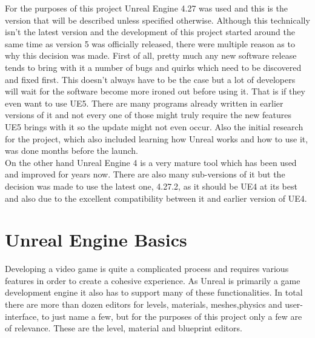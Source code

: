 For the purposes of this project Unreal Engine 4.27 was used and this is the version that will be described unless specified otherwise. Although this technically isn't the latest version and the development of this project started around the same time as version 5 was officially released, there were multiple reason as to why this decision was made. First of all, pretty much any new software release tends to bring with it a number of bugs and quirks which need to be discovered and fixed first. This doesn't always have to be the case but a lot of developers will wait for the software become more ironed out before using it. That is if they even want to use UE5. There are many programs already written in earlier versions of it and not every one of those might truly require the new features UE5 brings with it so the update might not even occur. Also the initial research for the project, which also included learning how Unreal works and how to use it, was done months before the launch.\\ On the other hand Unreal Engine 4 is a very mature tool which has been used and improved for years now. There are also many sub-versions of it but the decision was made to use the latest one, 4.27.2, as it should be UE4 at its best and also due to the excellent compatibility between it and earlier version of UE4.

\section{Unreal Engine Basics}\label{sec:Grundlage1}
Developing a video game is quite a complicated process and requires various features in order to create a cohesive experience. As Unreal is primarily a game development engine it also has to support many of these functionalities. In total there are more than dozen editors for levels, materials, meshes,physics and user-interface, to just name a few, but for the purposes of this project only a few are of relevance. These are the level, material and blueprint editors.\\

